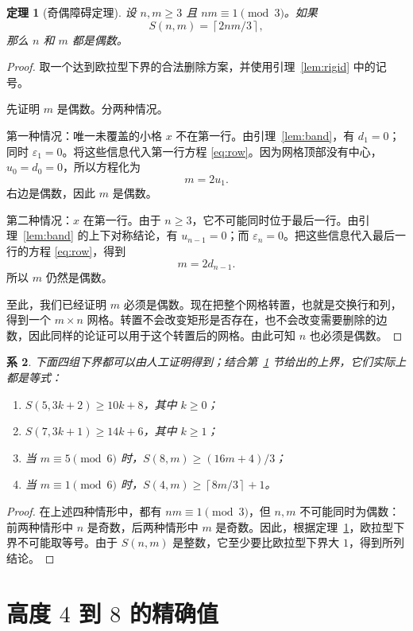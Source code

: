 \documentclass[11pt]{ctexart}
\newtheorem{theorem}{定理}[section]
\newtheorem{corollary}[theorem]{系}
\theoremstyle{definition}
\newcommand{\ceil}[1]{\left\lceil #1 \right\rceil}
\begin{document}
\begin{theorem}[奇偶障碍定理]\label{thm:parity}
设 $n,m\ge3$ 且 $nm\equiv1\pmod3$。如果
\[
S(n,m)=\ceil{2nm/3},
\]
那么 $n$ 和 $m$ 都是偶数。
\end{theorem}

\begin{proof}
取一个达到欧拉型下界的合法删除方案，并使用引理~\ref{lem:rigid} 中的记号。

先证明 $m$ 是偶数。分两种情况。

第一种情况：唯一未覆盖的小格 $x$ 不在第一行。由引理~\ref{lem:band}，有 $d_1=0$；同时 $\varepsilon_1=0$。将这些信息代入第一行方程 \eqref{eq:row}。因为网格顶部没有中心，$u_0=d_0=0$，所以方程化为
\[
m=2u_1.
\]
右边是偶数，因此 $m$ 是偶数。

第二种情况：$x$ 在第一行。由于 $n\ge3$，它不可能同时位于最后一行。由引理~\ref{lem:band} 的上下对称结论，有
$u_{n-1}=0$；而 $\varepsilon_n=0$。把这些信息代入最后一行的方程 \eqref{eq:row}，得到
\[
m=2d_{n-1}.
\]
所以 $m$ 仍然是偶数。

至此，我们已经证明 $m$ 必须是偶数。现在把整个网格转置，也就是交换行和列，得到一个 $m\times n$ 网格。转置不会改变矩形是否存在，也不会改变需要删除的边数，因此同样的论证可以用于这个转置后的网格。由此可知 $n$ 也必须是偶数。
\end{proof}

\begin{corollary}\label{cor:families}
下面四组下界都可以由人工证明得到；结合第~\ref{sec:exact} 节给出的上界，它们实际上都是等式：
\begin{enumerate}
\item $S(5,3k+2)\ge10k+8$，其中 $k\ge0$；
\item $S(7,3k+1)\ge14k+6$，其中 $k\ge1$；
\item 当 $m\equiv5\pmod6$ 时，$S(8,m)\ge(16m+4)/3$；
\item 当 $m\equiv1\pmod6$ 时，$S(4,m)\ge\ceil{8m/3}+1$。
\end{enumerate}
\end{corollary}

\begin{proof}
在上述四种情形中，都有 $nm\equiv1\pmod3$，但 $n,m$ 不可能同时为偶数：前两种情形中 $n$ 是奇数，后两种情形中 $m$ 是奇数。因此，根据定理~\ref{thm:parity}，欧拉型下界不可能取等号。由于 $S(n,m)$ 是整数，它至少要比欧拉型下界大 $1$，得到所列结论。
\end{proof}


\section{高度 $4$ 到 $8$ 的精确值}\label{sec:exact}
\end{document}
